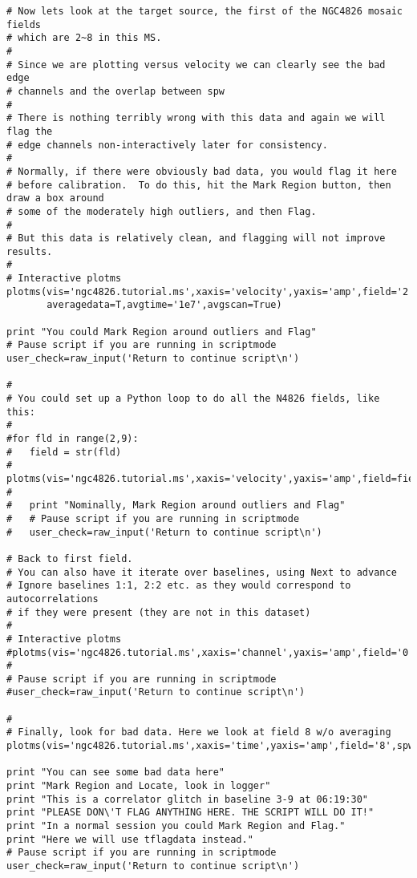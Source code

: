 \begin{verbatim}
# Now lets look at the target source, the first of the NGC4826 mosaic fields
# which are 2~8 in this MS.
#
# Since we are plotting versus velocity we can clearly see the bad edge
# channels and the overlap between spw
#
# There is nothing terribly wrong with this data and again we will flag the
# edge channels non-interactively later for consistency.
#
# Normally, if there were obviously bad data, you would flag it here
# before calibration.  To do this, hit the Mark Region button, then draw a box around
# some of the moderately high outliers, and then Flag.
#
# But this data is relatively clean, and flagging will not improve results.
#
# Interactive plotms
plotms(vis='ngc4826.tutorial.ms',xaxis='velocity',yaxis='amp',field='2',spw='12~15',
       averagedata=T,avgtime='1e7',avgscan=True)

print "You could Mark Region around outliers and Flag"
# Pause script if you are running in scriptmode
user_check=raw_input('Return to continue script\n')

#
# You could set up a Python loop to do all the N4826 fields, like this:
#
#for fld in range(2,9):
#	field = str(fld)
#	plotms(vis='ngc4826.tutorial.ms',xaxis='velocity',yaxis='amp',field=field,spw=spw,averagedata=T,avgtime='1e7',avgscan=True)
#
#	print "Nominally, Mark Region around outliers and Flag"
#	# Pause script if you are running in scriptmode
#	user_check=raw_input('Return to continue script\n')

# Back to first field.
# You can also have it iterate over baselines, using Next to advance
# Ignore baselines 1:1, 2:2 etc. as they would correspond to autocorrelations
# if they were present (they are not in this dataset)
#
# Interactive plotms
#plotms(vis='ngc4826.tutorial.ms',xaxis='channel',yaxis='amp',field='0',spw='0~3',averagedata=T,avgtime='1e7',avgscan=True)
#	
# Pause script if you are running in scriptmode
#user_check=raw_input('Return to continue script\n')

#
# Finally, look for bad data. Here we look at field 8 w/o averaging
plotms(vis='ngc4826.tutorial.ms',xaxis='time',yaxis='amp',field='8',spw='12~15')

print "You can see some bad data here"
print "Mark Region and Locate, look in logger"
print "This is a correlator glitch in baseline 3-9 at 06:19:30"
print "PLEASE DON\'T FLAG ANYTHING HERE. THE SCRIPT WILL DO IT!"
print "In a normal session you could Mark Region and Flag."
print "Here we will use tflagdata instead."
# Pause script if you are running in scriptmode
user_check=raw_input('Return to continue script\n')


\end{verbatim}
